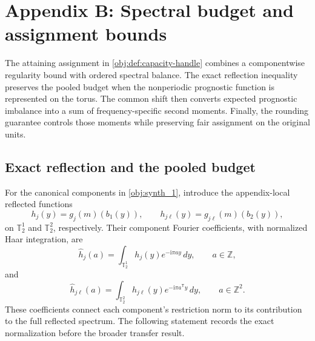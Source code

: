 \section{Appendix B: Spectral budget and assignment bounds}

The attaining assignment in \cref{obj:def:capacity-handle} combines a componentwise regularity bound with ordered spectral balance. The exact reflection inequality preserves the pooled budget when the nonperiodic prognostic function is represented on the torus. The common shift then converts expected prognostic imbalance into a sum of frequency-specific second moments. Finally, the rounding guarantee controls those moments while preserving fair assignment on the original units.

\subsection{Exact reflection and the pooled budget}

For the canonical components in \cref{obj:synth_1}, introduce the appendix-local reflected functions
\[
h_j(y)=g_j(m)(b_1(y)),
\qquad
h_{j\ell}(y)=g_{j\ell}(m)(b_2(y)),
\]
on \(\mathbb T_2^1\) and \(\mathbb T_2^2\), respectively. Their component Fourier coefficients, with normalized Haar integration, are
\[
\widehat h_j(a)
=\int_{\mathbb T_2^1}h_j(y)e^{-\mathrm i\pi ay}\,dy,
\qquad a\in\mathbb Z,
\]
and
\[
\widehat h_{j\ell}(a)
=\int_{\mathbb T_2^2}h_{j\ell}(y)e^{-\mathrm i\pi a^{\mathsf T}y}\,dy,
\qquad a\in\mathbb Z^2.
\]
These coefficients connect each component's restriction norm to its contribution to the full reflected spectrum. The following statement records the exact normalization before the broader transfer result.

